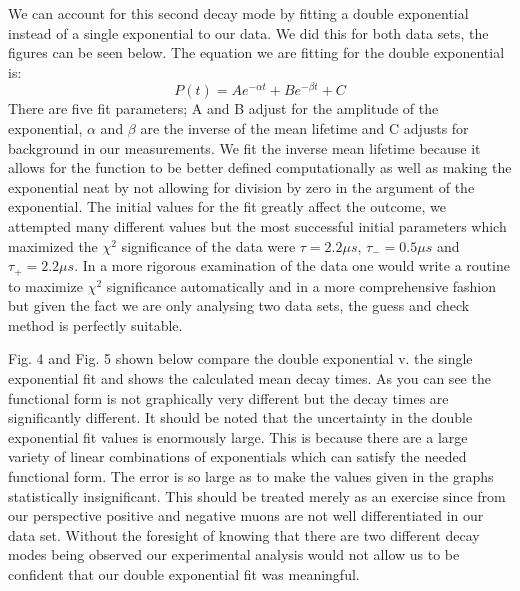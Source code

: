 \indent \indent We can account for this second decay mode by fitting a double exponential instead of a single exponential to our data.  We did this for both data sets, the figures can be seen below. The equation we are fitting for the double exponential is:
\begin{equation}
P(t) = Ae^{-\alpha t} + Be^{-\beta t} + C
\end{equation}
There are five fit parameters; A and B adjust for the amplitude of the exponential, $\alpha$ and $\beta$ are the inverse of the mean lifetime and C adjusts for background in our measurements. We fit the inverse mean lifetime because it allows for the function to be better defined computationally as well as making the exponential neat by not allowing for division by zero in the argument of the exponential. The initial values for the fit greatly affect the outcome, we attempted many different values but the most successful initial parameters which maximized the $\chi^2$ significance of the data were $\tau = 2.2 \mu s$, $\tau_- = 0.5 \mu s$ and $\tau_+ = 2.2 \mu s$. In a more rigorous examination of the data one would write a routine to maximize $\chi^2$ significance automatically and in a more comprehensive fashion but given the fact we are only analysing two data sets, the guess and check method is perfectly suitable. 

\indent \indent Fig. 4 and Fig. 5 shown below compare the double exponential v. the single exponential fit and shows the calculated mean decay times.  As you can see the functional form is not graphically very different but the decay times are significantly different.  It should be noted that the uncertainty in the double exponential fit values is enormously large.  This is because there are a large variety of linear combinations of exponentials which can satisfy the needed functional form.  The error is so large as to make the values given in the graphs statistically insignificant. This should be treated merely as an exercise since from our perspective positive and negative muons are not well differentiated in our data set. Without the foresight of knowing that there are two different decay modes being observed our experimental analysis would not allow us to be confident that our double exponential fit was meaningful.    

